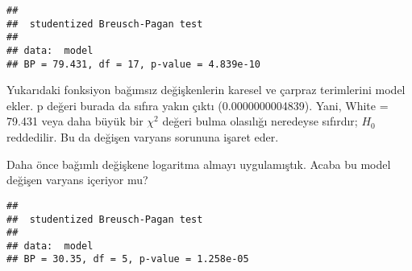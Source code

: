 \documentclass[
]{book}
\newenvironment{Shaded}{\begin{snugshade}}{\end{snugshade}}
\newcommand{\DataTypeTok}[1]{\textcolor[rgb]{0.13,0.29,0.53}{#1}}
\newcommand{\KeywordTok}[1]{\textcolor[rgb]{0.13,0.29,0.53}{\textbf{#1}}}
\newcommand{\NormalTok}[1]{#1}
\newcommand{\OperatorTok}[1]{\textcolor[rgb]{0.81,0.36,0.00}{\textbf{#1}}}
\newcommand{\StringTok}[1]{\textcolor[rgb]{0.31,0.60,0.02}{#1}}
\begin{document}
\begin{verbatim}
## 
##  studentized Breusch-Pagan test
## 
## data:  model
## BP = 79.431, df = 17, p-value = 4.839e-10
\end{verbatim}

Yukarıdaki fonksiyon bağımsız değişkenlerin karesel ve çarpraz terimlerini model ekler. p değeri burada da sıfıra yakın çıktı (0.0000000004839). Yani, White = 79.431 veya daha büyük bir \(\chi^2\) değeri bulma olasılığı neredeyse sıfırdır; \(H_0\) reddedilir. Bu da değişen varyans sorununa işaret eder.

Daha önce bağımlı değişkene logaritma almayı uygulamıştık. Acaba bu model değişen varyans içeriyor mu?

\begin{Shaded}
\end{Shaded}

\begin{verbatim}
## 
##  studentized Breusch-Pagan test
## 
## data:  model
## BP = 30.35, df = 5, p-value = 1.258e-05
\end{verbatim}
\end{document}
